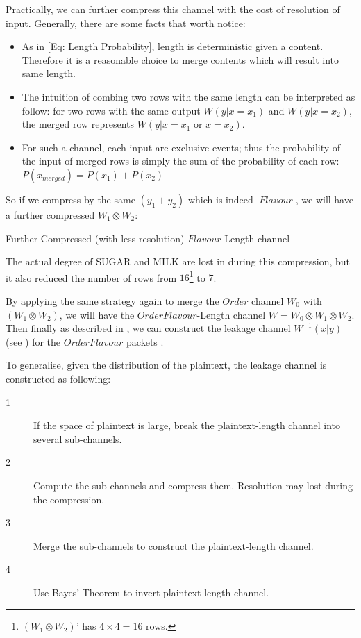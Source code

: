 \begin{example}
Practically, we can further compress this channel with the cost of resolution of input. Generally, there are some facts that worth notice:
\begin{itemize}
\item As in \eqref{Eq: Length Probability},  length is deterministic given a content. Therefore it is a reasonable choice to merge contents which will result into same length.
\item The intuition of combing two rows with the same length can be interpreted as follow: for two rows with the same output $W(y| x=x_1)$ and $W(y|x=x_2)$, the merged row represents $W(y|x=x_1 \text{ or } x = x_2 )$.
\item For such a channel, each input are exclusive events; thus the probability of the input of merged rows is simply the sum of the probability of each row: $P(x_{merged}) = P(x_1) + P(x_2)$
\end{itemize} 

So if we compress  by the same $(y_1 + y_2)$ which is indeed $|Flavour|$, we will have a further compressed $W_1 \otimes W_2$:

\begin{table}[H]
\begin{center}
{}
\end{center}
\caption{Further Compressed (with less resolution) $Flavour$-Length channel }
\label{Tbl: Further Compressed Flavour}
\end{table}

The actual degree of SUGAR and MILK are lost in  during this compression, but it also reduced the number of rows from $16$\footnote{$(W_1 \otimes W_2)’$ has $4 \times 4 = 16$ rows.} to $7$.

By applying the same strategy again to merge the $Order$ channel $W_0$ with $(W_1 \otimes W_2)$, we will have the $OrderFlavour$-Length channel $W = W_0 \otimes W_1 \otimes W_2$. Then finally as described in , we can construct the leakage channel $W^{-1}(x|y)$ (see ) for the $OrderFlavour$ packets .
\end{example}

To generalise, given the distribution of the plaintext, the leakage channel is constructed as following:
\begin{description}
\item[1] If the space of plaintext is large, break the plaintext-length channel into several sub-channels.
\item[2] Compute the sub-channels and compress them. Resolution may lost during the compression.
\item[3] Merge the sub-channels to construct the plaintext-length channel.
\item[4] Use Bayes’ Theorem to invert plaintext-length channel.
\end{description}

